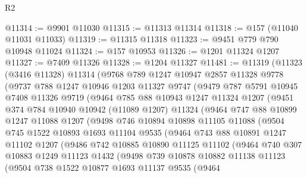 \begin{lexlean}{R2}
\begin{coremodule}
@11314 := @9901 @11030
@11315 := @11313 @11314
@11318 := @157 (@11040 @11031 @11033)
@11319 := @11315 @11318
@11323 := @9451 @779 @790 @10948 @11024
@11324 := @157 @10953
@11326 := @1201 @11324 @1207
@11327 := @7409 @11326
@11328 := @1204 @11327
@11481 := @11319
    (@11323
      (@3416 @11328)
      @11314
      (@9768
        @789
        @1247
        @10947
        @2857
        @11328
        @9778
        (@9737
          @788
          @1247
          @10946
          @1203
          @11327
          @9747
          (@9479
            @787
            @5791
            @10945
            @7408
            @11326
            @9719
            (@9464
              @785
              @88
              @10943
              @1247
              @11324
              @1207
              (@9451
                @374
                @784
                @10940
                @10942
                (@11089 @1207)
                @11324
                (@9464
                  @747
                  @88
                  @10899
                  @1247
                  @11088
                  @1207
                  (@9498
                    @746
                    @10894
                    @10898
                    @11105
                    @11088
                    (@9504
                      @745
                      @1522
                      @10893
                      @1693
                      @11104
                      @9535
                      (@9464
                        @743
                        @88
                        @10891
                        @1247
                        @11102
                        @1207
                        (@9486
                          @742
                          @10885
                          @10890
                          @11125
                          @11102
                          (@9464
                            @740
                            @307
                            @10883
                            @1249
                            @11123
                            @1432
                            (@9498
                              @739
                              @10878
                              @10882
                              @11138
                              @11123
                              (@9504
                                @738
                                @1522
                                @10877
                                @1693
                                @11137
                                @9535
                                (@9464

\end{coremodule}
\end{lexlean}
